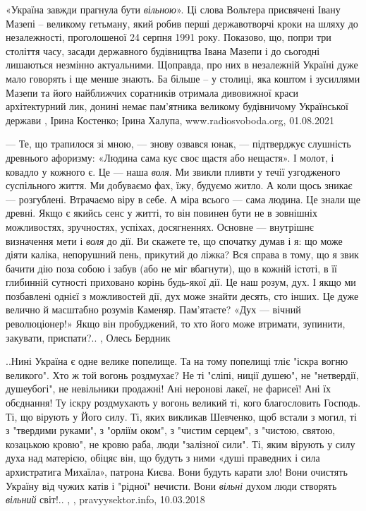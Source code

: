 «Україна завжди прагнула бути \emph{вільною}». Ці слова Вольтера присвячені
Івану Мазепі – великому гетьману, який робив перші державотворчі кроки на шляху
до незалежності, проголошеної 24 серпня 1991 року.  Показово, що, попри три
століття часу, засади державного будівництва Івана Мазепи і до сьогодні
лишаються незмінно актуальними.  Щоправда, про них в незалежній Україні дуже
мало говорять і ще менше знають. Ба більше – у столиці, яка коштом і зусиллями
Мазепи та його найближчих соратників отримала дивовижної краси архітектурний
лик, донині немає пам’ятника великому будівничому Української держави
, 
Ірина Костенко; Ірина Халупа, www.radiosvoboda.org, 01.08.2021

— Те, що трапилося зі мною, — знову озвався юнак, — підтверджує слушність
древнього афоризму: «Людина сама кує своє щастя або нещастя». І молот, і
ковадло у кожного є. Це — наша \emph{воля}. Ми звикли пливти у течії узгодженого
суспільного життя. Ми добуваємо фах, їжу, будуємо житло. А коли щось зникає —
розгублені. Втрачаємо віру в себе. А міра всього — сама людина. Це знали ще
древні. Якщо є якийсь сенс у житті, то він повинен бути не в зовнішніх
можливостях, зручностях, успіхах, досягненнях. Основне — внутрішнє визначення
мети і \emph{воля} до дії. Ви скажете те, що спочатку думав і я: що може діяти каліка,
непорушний пень, прикутий до ліжка? Вся справа в тому, що я звик бачити дію
поза собою і забув (або не міг вбагнути), що в кожній істоті, в її глибинній
сутності приховано корінь будь-якої дії. Це наш розум, дух. І якщо ми
позбавлені однієї з можливостей дії, дух може знайти десять, сто інших. Це дуже
велично й масштабно розумів Каменяр. Пам’ятаєте? «Дух — вічний революціонер!»
Якщо він пробуджений, то хто його може втримати, зупинити, закувати,
приспати?..
, Олесь Бердник

..Нині Україна є одне велике попелище. Та на тому попелищі тліє "іскра вогню
великого". Хто ж той вогонь роздмухає? Не ті "сліпі, ниції душею", не
"нетвердії, душеубогі", не невільники продажні! Ані неронові лакеї, не фарисеї!
Ані їх обєднання! Ту іскру роздмухають у вогонь великий ті, кого благословить
Господь. Ті, що вірують у Його силу. Ті, яких викликав Шевченко, щоб встали з
могил, ті з "твердими руками", з "орліїм оком", з "чистим серцем", з "чистою,
святою, козацькою кровю", не кровю раба, люди "залізної сили". Ті, яким вірують
у силу духа над матерією, обіцяє він, що будуть з ними «душі праведних і сила
архистратига Михаїла», патрона Києва. Вони будуть карати зло! Вони очистять
Україну від чужих катів і "рідної" нечисти. Вони \emph{вільні} духом люди створять
\emph{вільний} світ!..
, , pravyysektor.info, 10.03.2018

